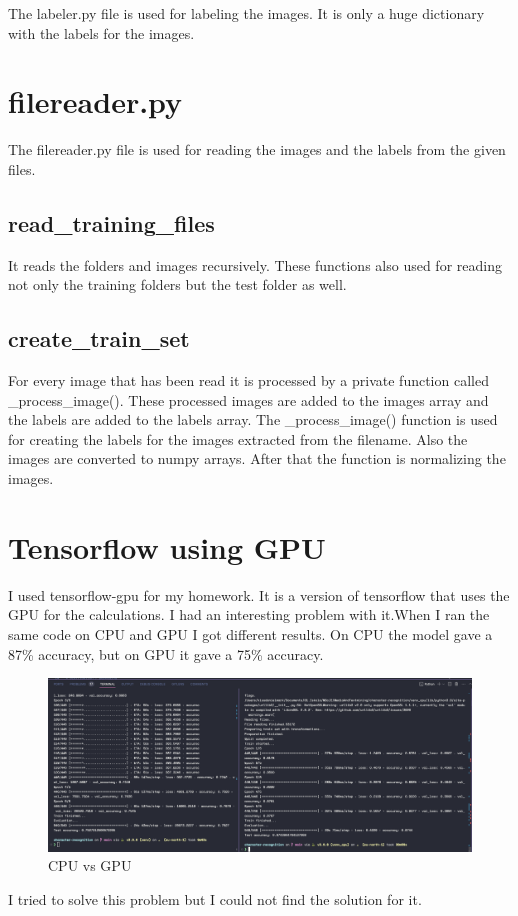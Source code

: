 \documentclass[11pt,a4paper,oneside]{report}
\begin{document}
The labeler.py file is used for labeling the images. It is only a huge dictionary with the labels for the images.

\section{filereader.py}

The filereader.py file is used for reading the images and the labels from the given files.
\subsection{read\_training\_files}
It reads the folders and images recursively.
These functions also used for reading not only the training folders but the test folder as well.

\subsection{create\_train\_set}
For every image that has been read it is processed by a private function called \_process\_image().
These processed images are added to the images array and the labels are added to the labels array.
The \_process\_image() function is used for creating the labels for the images extracted from the filename.
Also the images are converted to numpy arrays.
After that the function is normalizing the images.

\section{Tensorflow using GPU}

I used tensorflow-gpu for my homework.
It is a version of tensorflow that uses the GPU for the calculations. I had an interesting problem with it.When I ran the same code on CPU and GPU I got different results.
On CPU the model gave a 87\% accuracy, but on GPU it gave a 75\% accuracy.
\begin{figure}[h]
  \caption{CPU vs GPU}
  \centering
  \includegraphics[width=\textwidth]{cpuvsgpu}
\end{figure}
I tried to solve this problem but I could not find the solution for it.
\end{document}
